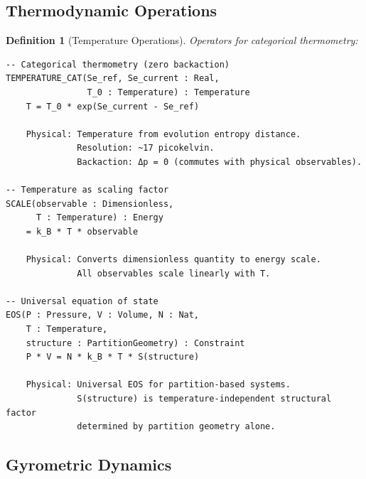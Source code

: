 \documentclass[aps,prd,twocolumn,superscriptaddress,floatfix,nofootinbib]{revtex4-2}
\newtheorem{definition}[theorem]{Definition}
\theoremstyle{remark}
\begin{document}
\subsection{Thermodynamic Operations}

\begin{definition}[Temperature Operations]
\label{def:temperature_ops}
Operators for categorical thermometry:
\begin{verbatim}
-- Categorical thermometry (zero backaction)
TEMPERATURE_CAT(Se_ref, Se_current : Real,
                T_0 : Temperature) : Temperature
    T = T_0 * exp(Se_current - Se_ref)
    
    Physical: Temperature from evolution entropy distance.
              Resolution: ~17 picokelvin.
              Backaction: Δp = 0 (commutes with physical observables).

-- Temperature as scaling factor
SCALE(observable : Dimensionless,
      T : Temperature) : Energy
    = k_B * T * observable
    
    Physical: Converts dimensionless quantity to energy scale.
              All observables scale linearly with T.

-- Universal equation of state
EOS(P : Pressure, V : Volume, N : Nat,
    T : Temperature,
    structure : PartitionGeometry) : Constraint
    P * V = N * k_B * T * S(structure)
    
    Physical: Universal EOS for partition-based systems.
              S(structure) is temperature-independent structural factor
              determined by partition geometry alone.
\end{verbatim}
\end{definition}

\subsection{Gyrometric Dynamics}
\end{document}
